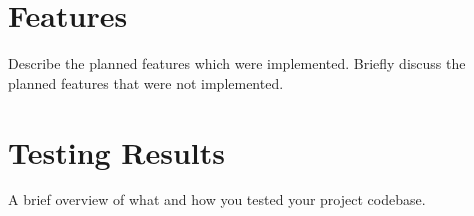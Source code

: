 \section{Features}

Describe the planned features which were implemented. Briefly discuss the planned features that were not implemented.




\section{Testing Results}

A brief overview of what and how you tested your project codebase.

